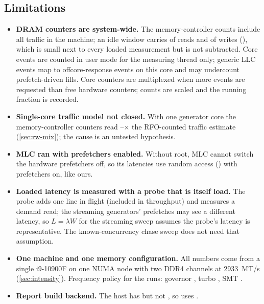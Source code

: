 \subsection{Limitations}
\begin{itemize}
  \item \textbf{DRAM counters are system-wide.} The memory-controller counts include all traffic in the
        machine; an idle window carries  of reads and
         of writes (), which is small
        next to every loaded measurement but is not subtracted. Core events are counted in user mode for
        the measuring thread only; generic LLC events map to offcore-response events on this core and may
        undercount prefetch-driven fills. Core counters are multiplexed when more events are requested
        than free hardware counters; counts are scaled and the running fraction is recorded.
  \item \textbf{Single-core traffic model not closed.} With one generator core the memory-controller
        counters read --$\times$ the RFO-counted traffic
        estimate (\cref{sec:rw-mix}); the cause is an untested hypothesis.
  \item \textbf{MLC ran with prefetchers enabled.} Without root, MLC cannot switch the hardware
        prefetchers off, so its latencies use random access () with prefetchers on, like ours.
  \item \textbf{Loaded latency is measured with a probe that is itself load.} The probe adds one line in
        flight (included in throughput) and measures a demand read; the streaming generators' prefetches
        may see a different latency, so $L=\lambda W$ for the streaming sweep assumes the probe's latency
        is representative. The known-concurrency chase sweep does not need that assumption.
  \item \textbf{One machine and one memory configuration.} All numbers come from a single i9-10900F on one
        NUMA node with two DDR4 channels at \qty{2933}{MT/s} (\cref{sec:intensity}). Frequency policy for the
        runs: governor \sysGovernor{}, turbo \sysTurbo{}, SMT \sysSMT{}.
  \item \textbf{Report build backend.} The host has  but not , so
         uses .
\end{itemize}
